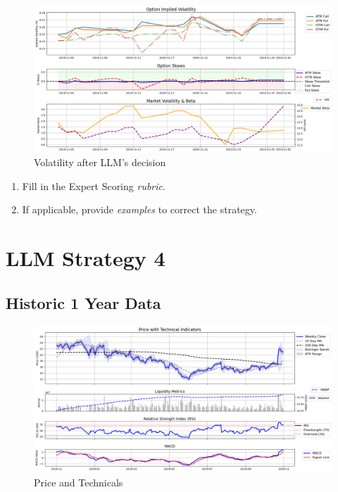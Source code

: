 \documentclass[8pt]{scrartcl}
\begin{document}
\begin{figure}[H]
    \centering
    \includegraphics[width=1\linewidth]{judge_reviews/GOOGL_M_gpt-4o-mini/2019-11-01/llm_Market_Volatility_&_Beta.png}
    \caption{Volatility after LLM's decision}
\end{figure}

\begin{tcolorbox}[colback=blue!10, colframe=blue!60, title=\textbf{TASKS}, sharp corners=southwest]
\begin{enumerate}
    \item Fill in the Expert Scoring \textit{rubric}.
    \item If applicable, provide \textit{examples} to correct the strategy.
\end{enumerate}
\end{tcolorbox}
\newpage


\section*{LLM Strategy 4}
\label{app:s4}

\subsection*{Historic 1 Year Data}

\begin{figure}[H]
    \centering
    \includegraphics[width=1\linewidth]{judge_reviews//TSLA_M_gpt-4o-mini//2019-11-01/judge_Price_with_Technical_Indicators.png}
    \caption{Price and Technicals}
\end{figure}
\end{document}

